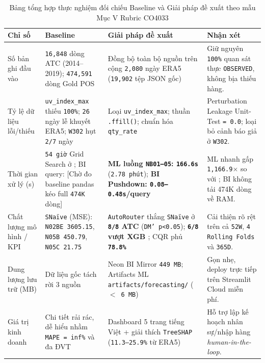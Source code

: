 \begin{table}[H]
\centering
\caption{Bảng tổng hợp thực nghiệm đối chiếu Baseline và Giải pháp đề xuất theo mẫu Mục V Rubric CO4033}
\label{tab:co4033_exp_summary}
\renewcommand{\arraystretch}{1.22}
\begin{tabularx}{\textwidth}{|p{}|p{}|p{}|X|}
\hline
\textbf{Chỉ số} & \textbf{Baseline} & \textbf{Giải pháp đề xuất} & \textbf{Nhận xét} \\
\hline
Số bản ghi đầu vào & \texttt{16,848} dòng ATC (2014--2019); \texttt{474,591} dòng Gold POS & Đồng bộ toàn bộ nguồn trên cộng \texttt{2,080} ngày ERA5 (\texttt{19,902} tệp JSON gốc) & Giữ nguyên \texttt{100\%} quan sát thực \texttt{OBSERVED}, không bịa thiếu hàng. \\
\hline
Tỷ lệ dữ liệu lỗi/thiếu & \texttt{uv\_index\_max} thiếu \texttt{100\%}; \texttt{26} ngày lễ khuyết ERA5; \texttt{W302} hụt \texttt{2/7} ngày & Loại \texttt{uv\_index\_max}; thuần \texttt{.ffill()}; chuẩn hóa \texttt{qty\_rate} & Perturbation Leakage Unit-Test \texttt{= 0.0}; loại bỏ cảnh báo giả ở \texttt{W302}. \\
\hline
Thời gian xử lý (s) & \texttt{54 giờ} Grid Search ở \cite{fourkiotis2024}; BI query: [Chờ đo baseline pandas kéo full \texttt{474K} dòng] & \textbf{ML luồng \texttt{NB01--05}: \texttt{166.6s}} (\texttt{2.78 phút}); \textbf{BI Pushdown: \texttt{0.08--0.48s}/query} & ML nhanh gấp \texttt{1,166.9$\times$} so với \cite{fourkiotis2024}; BI không tải 474K dòng về RAM. \\
\hline
Chất lượng mô hình / KPI & \texttt{SNaïve} (MSE): \texttt{N02BE 3605.15}, \texttt{N05B 450.79}, \texttt{N05C 21.75} & \texttt{AutoRouter} thắng \texttt{SNaïve} ở \textbf{\texttt{8/8} ATC} (\texttt{DM' p<0.05}); \textbf{\texttt{6/8} vượt XGB \cite{fourkiotis2024}}; CQR phủ \textbf{\texttt{78.8\%}} & Cải thiện rõ rệt trên cả \texttt{52W}, \texttt{4 Rolling Folds} và \texttt{365D}. \\
\hline
Dung lượng lưu trữ (MB) & Dữ liệu gốc tách rời 3 nguồn & Neon BI Mirror \texttt{449 MB}; Artifacts ML \texttt{artifacts/forecasting/} (\texttt{$<$ 6 MB}) & Gọn nhẹ, deploy trực tiếp trên Streamlit Cloud miễn phí. \\
\hline
Giá trị kinh doanh & Chi tiết rải rác, dễ hiểu nhầm \texttt{MAPE = inf\%} và đa ĐVT & Dashboard 5 trang tiếng Việt + giải thích \texttt{TreeSHAP} (\texttt{11.3--25.9\%} từ ERA5) & Hỗ trợ lập kế hoạch nhân sự/nhập hàng \textit{human-in-the-loop}. \\
\hline
\end{tabularx}
\end{table}

